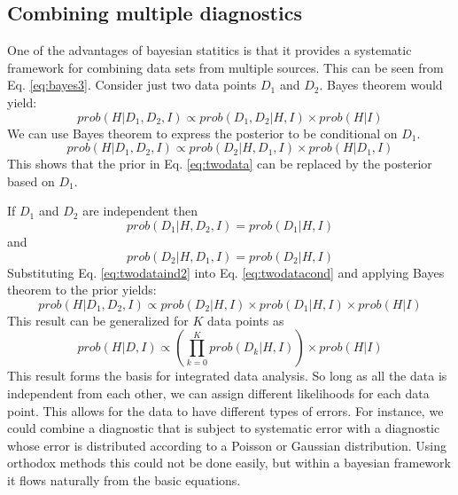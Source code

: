 \documentclass[12pt]{article}
\numberwithin{equation}{section}
\begin{document}
\subsection{Combining multiple diagnostics}
One of the advantages of bayesian statitics is that it provides a systematic framework for combining data sets from multiple sources. 
This can be seen from Eq. \ref{eq:bayes3}. Consider just two data points $D_1$ and $D_2$. Bayes theorem would yield:
\begin{equation} \label{eq:twodata}
	prob(H|D_1,D_2,I) \propto prob(D_1,D_2|H,I) \times prob(H|I)
\end{equation}
We can use Bayes theorem to express the posterior to be conditional on $D_1$.
\begin{equation} \label{eq:twodatacond}
	prob(H|D_1,D_2,I) \propto prob(D_2|H,D_1,I) \times prob(H|D_1,I)
\end{equation}
This shows that the prior in Eq. \ref{eq:twodata} can be replaced by the posterior based on $D_1$. 

If $D_1$ and $D_2$ are independent then
\begin{equation} \label{eq:twodataind1}
	prob(D_1|H,D_2,I) = prob(D_1|H,I)
\end{equation}
and
\begin{equation} \label{eq:twodataind2}
	prob(D_2|H,D_1,I) = prob(D_2|H,I)
\end{equation}
Substituting Eq. \ref{eq:twodataind2} into Eq. \ref{eq:twodatacond} and applying Bayes theorem to the prior yields:
\begin{equation} \label{eq:twodataexpand}
	prob(H|D_1,D_2,I) \propto prob(D_2|H,I) \times prob(D_1|H,I) \times prob(H|I)
\end{equation}
This result can be generalized for $K$ data points as 
\begin{equation} \label{eq:IDA}
	{prob(H|D,I)} \propto {\left( \prod\limits_{k=0}^K{prob(D_k|H,I)}\right)} \times {prob(H|I)}
\end{equation}
This result forms the basis for integrated data analysis. So long as all the data is independent from each other, we can assign 
different likelihoods for each data point. This allows for the data to have different types of errors. For instance, we could combine 
a diagnostic that is subject to systematic error with a diagnostic whose error is distributed according to a Poisson or Gaussian 
distribution. Using orthodox methods this could not be done easily, but within a bayesian framework it flows naturally from the 
basic equations. 
\end{document}
